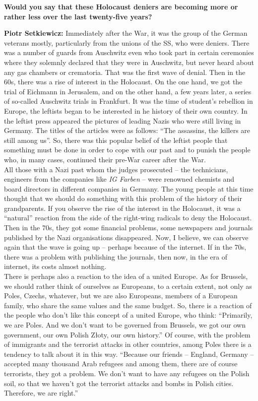 \textbf{Would you say that these Holocaust deniers are becoming more or rather less over the last twenty-five years?}

\textbf{Piotr Setkiewicz:} Immediately after the War, it was the group of the German veterans mostly, particularly from the unions of the SS, who were deniers. There was a number of guards from Auschwitz even who took part in certain ceremonies where they solemnly declared that they were in Auschwitz, but never heard about any gas chambers or crematoria. That was the first wave of denial. Then in the 60s, there was a rise of interest in the Holocaust. On the one hand, we got the trial of Eichmann in Jerusalem, and on the other hand, a few years later, a series of so-called Auschwitz trials in Frankfurt. It was the time of student’s rebellion in Europe, the leftists began to be interested in he history of their own country. In the leftist press appeared the pictures of leading Nazis who were still living in Germany. The titles of the articles were as follows: ``The assassins, the killers are still among us''. So, there was this popular belief of the leftist people that something must be done in order to cope with our past and to punish the people who, in many cases, continued their pre-War career after the War.\\ 
All those with a Nazi past whom the judges prosecuted – the technicians, engineers from the companies like \textit{IG Farben} – were renowned chemists and board directors in different companies in Germany. The young people at this time thought that we should do something with this problem of the history of their grandparents. If you observe the rise of the interest in the Holocaust, it was a ``natural'' reaction from the side of the right-wing radicals to deny the Holocaust.\\
Then in the 70s, they got some financial problems, some newspapers and journals published by the Nazi organisations disappeared. Now, I believe, we can observe again that the wave is going up – perhaps because of the internet. If in the 70s, there was a problem with publishing the journals, then now, in the era of internet, its costs almost nothing.\\ 
There is perhaps also a reaction to the idea of a united Europe. As for Brussels, we should rather think of ourselves as Europeans, to a certain extent, not only as Poles, Czechs, whatever, but we are also Europeans, members of a European family, who share the same values and the same budget. So, there is a reaction of the people who don’t like this concept of a united Europe, who think: ``Primarily, we are Poles. And we don’t want to be governed from Brussels, we got our own government, our own Polish Złoty, our own history.'' Of course, with the problem of immigrants and the terrorist attacks in other countries, among Poles there is a tendency to talk about it in this way. ``Because our friends – England, Germany – accepted many thousand Arab refugees and among them, there are of course terrorists, they got a problem. We don’t want to have any refugees on the Polish soil, so that we haven’t got the terrorist attacks and bombs in Polish cities. Therefore, we are right.''

